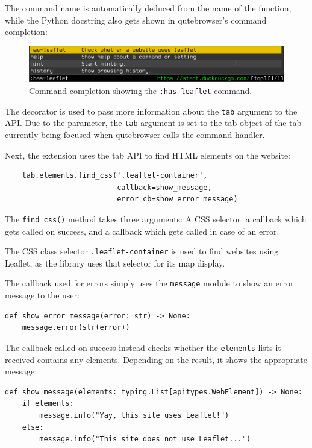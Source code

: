 The command name is automatically deduced from the name of the function, while
the Python docstring also gets shown in qutebrowser's command completion:

\begin{figure}[H]
  \centering
  \includegraphics[width=\linewidth]{img/screenshot-completion.png}
  \caption{Command completion showing the \texttt{:has-leaflet} command.}
\end{figure}

The  decorator is used to pass more information
about the \verb|tab| argument to the API. Due to the
 parameter, the \verb|tab| argument is set to
the tab object of the tab currently being focused when qutebrowser calls the
command handler.

Next, the extension uses the tab API to find HTML elements on the website:

\begin{verbatim}
    tab.elements.find_css('.leaflet-container',
                          callback=show_message,
                          error_cb=show_error_message)
\end{verbatim}

The \verb|find_css()| method takes three arguments: A CSS selector, a callback
which gets called on success, and a callback which gets called in case of an
error.

The CSS class selector \verb|.leaflet-container| is used to find websites using
Leaflet, as the library uses that selector for its map display.

The callback used for errors simply uses the \verb|message| module to show an
error message to the user:

\begin{verbatim}
def show_error_message(error: str) -> None:
    message.error(str(error))
\end{verbatim}

The callback called on success instead checks whether the \verb|elements| lists
it received contains any elements. Depending on the result, it shows the
appropriate message:

\begin{verbatim}
def show_message(elements: typing.List[apitypes.WebElement]) -> None:
    if elements:
        message.info("Yay, this site uses Leaflet!")
    else:
        message.info("This site does not use Leaflet...")
\end{verbatim}

